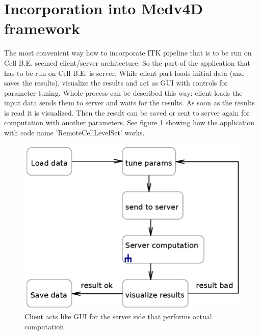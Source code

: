 \section{Incorporation into Medv4D framework}

\par
The most convenient way how to incorporate ITK pipeline that is to be run on Cell B.E. seemed client/server architecture.
So the part of the application that has to be run on Cell B.E. is server.
While client part loads initial data (and saves the results), visualize the results and act as GUI with controls for parameter tuning.
Whole process can be described this way: client loads the input data sends them to server and waits for the results.
As soon as the results is read it is visualized.
Then the result can be saved or sent to server again for computation with another parameters.
See figure \ref{fg:computationProcess} showing how the application with code name 'RemoteCellLevelSet' works.

\begin{figure}
    \centering
    \includegraphics[width=\textwidth]{data/computationProcess}
    \caption[RemoteCellLevelSet application computation process]{Client acts like GUI for the server side that performs actual computation}
    \label{fg:computationProcess}
\end{figure}


